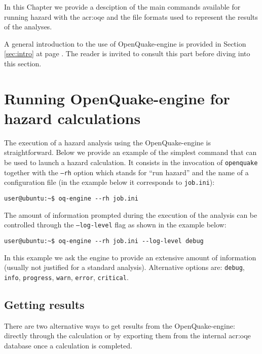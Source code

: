In this Chapter we provide a desciption of the main commands available
for running hazard with the \gls{acr:oqe} and the file formats used to 
represent the results of the analyses.

A general introduction to the use of OpenQuake-engine is provided in Section 
\ref{sec:intro} at page \pageref{sec:intro}.
The reader is invited to consult this part before diving into this section.
\section{Running OpenQuake-engine for hazard calculations}
The execution of a hazard analysis using the OpenQuake-engine 
is straightforward. Below we provide an example of the simplest 
command that can be used to launch a hazard calculation. 
It consists in the invocation of \texttt{openquake} together with 
the \texttt{--rh} option which stands for ``run hazard'' and 
the name of a configuration file (in the example below
it corresponds to \texttt{job.ini}):
\begin{Verbatim}[frame=single, commandchars=\\\{\}, fontsize=\small]
user@ubuntu:~$ oq-engine --rh job.ini
\end{Verbatim}

The amount of information prompted during the execution of the 
analysis can be controlled through the \texttt{--log-level} flag 
as shown in the example below:
\begin{Verbatim}[frame=single, commandchars=\\\{\}, fontsize=\small]
user@ubuntu:~$ oq-engine --rh job.ini --log-level debug
\end{Verbatim}
In this example we ask the engine to provide an extensive amount
of information (usually not justified for a standard analysis). 
Alternative options are: \texttt{debug}, \texttt{info}, \texttt{progress},
\texttt{warn}, \texttt{error}, \texttt{critical}.
\subsection{Getting results}
\label{sec:getting_results}
There are two alternative ways to get results from the OpenQuake-engine:
directly through the calculation or by exporting them from the 
internal \gls{acr:oqe} database once a calculation is completed. 

